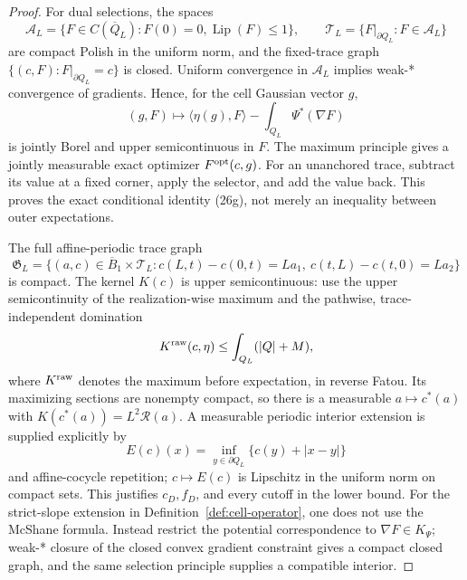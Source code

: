 \documentclass{aomart}
\theoremstyle{definition}
\newcommand{\1}{\mathbf 1}
\begin{document}
\begin{proof}
For dual selections, the spaces
\begin{equation*}
\mathscr A_ L=\{F\in C(\overline Q_ L):F(0)=0,
\operatorname {Lip}(F)\leq1\},
\qquad \mathcal T_ L=\{F|_ {\partial Q_ L}:F\in\mathscr A_ L\}
\end{equation*}
are compact Polish in the uniform norm, and the fixed-trace graph
$\{(c,F):F|_ {\partial Q_ L}=c\}$ is closed.  Uniform convergence in
$\mathscr A_ L$ implies weak-* convergence of gradients.  Hence, for
the cell Gaussian vector $g$,
\begin{equation}
(g,F)\longmapsto\langle\eta(g),F\rangle
-\int_ {Q_ L}\Psi^*(\nabla F)
\tag{26q}
\end{equation}
is jointly Borel and upper semicontinuous in $F$.  The maximum
principle gives a jointly measurable exact optimizer
$F^{\rm opt}(c,g)$.  For an unanchored trace, subtract its value at a
fixed corner, apply the selector, and add the value back.  This proves
the exact conditional identity (26g), not merely an inequality between
outer expectations.

The full affine-periodic trace graph
\begin{equation}
\mathfrak G_ L=\{(a,c)\in\overline B_ 1\times\mathcal T_ L:
c(L,t)-c(0,t)=La_ 1,\ c(t,L)-c(t,0)=La_ 2\}
\tag{26r}
\end{equation}
is compact.  The kernel $K(c)$ is upper semicontinuous: use the
upper semicontinuity of the realization-wise maximum and the pathwise,
trace-independent domination
\begin{equation*}
K^{\rm raw}(c,\eta)\leq\int_ {Q_ L}(|Q|+M),
\end{equation*}
where
$K^{\rm raw}$ denotes the maximum before expectation, in reverse
Fatou.  Its maximizing sections are
nonempty compact, so there is a measurable
$a\mapsto c^*(a)$ with $K(c^*(a))=L^2\mathcal R(a)$.  A measurable periodic
interior extension is supplied explicitly by
\begin{equation*}
E(c)(x)=\inf_ {y\in\partial Q_ L}\{c(y)+|x-y|\}
\end{equation*}
and affine-cocycle repetition; $c\mapsto E(c)$ is Lipschitz in the
uniform norm on compact sets.  This justifies $c_ D,f_ D$, and every
cutoff in the lower bound.  For the strict-slope extension in Definition~\ref{def:cell-operator}, one does not use the McShane formula.  Instead restrict
the potential correspondence to $\nabla F\in K_ \Psi$; weak-* closure
of the closed convex gradient constraint gives a compact closed graph,
and the same selection principle supplies a compatible interior.


\end{proof}
\end{document}
